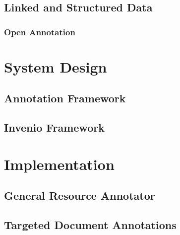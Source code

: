 \documentclass[12pt,a4paper]{report}
\begin{document}
    \clearpage

    \subsection{Linked and Structured Data}
      \label{sec:data}
      

      \subsubsection{Open Annotation}
        \label{sec:oa}
        

  \cleardoublepage

  \section{System Design}
    \label{sec:design}
    

    \subsection{Annotation Framework}
      \label{sec:anno}
      

    \subsection{Invenio Framework}
      \label{sec:v2}
      

  \cleardoublepage

  \section{Implementation}
    \label{sec:impl}
    

    \subsection{General Resource Annotator}
      \label{sec:gra}
      

    \subsection{Targeted Document Annotations}
      \label{sec:notes}
      

    \clearpage
\end{document}
